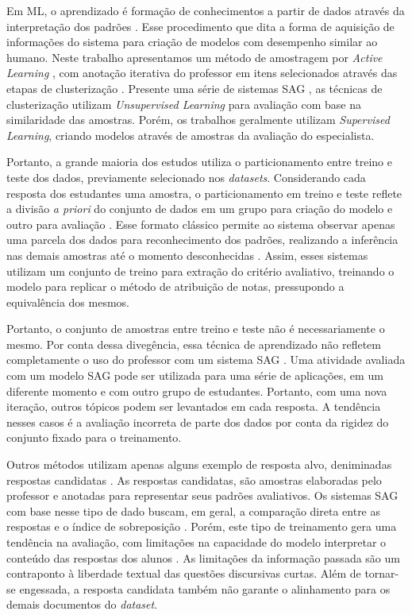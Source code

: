 Em ML, o aprendizado é formação de conhecimentos a partir de dados através da interpretação dos padrões \cite{bishop2006}. Esse procedimento que dita a forma de aquisição de informações do sistema para criação de modelos com desempenho similar ao humano. Neste trabalho apresentamos um método de amostragem por \textit{Active Learning} \cite{kumar2020}, com anotação iterativa do professor em itens selecionados através das etapas de clusterização \cite{horbach2018}. Presente uma série de sistemas SAG \cite{basu2013, zhang2016, marvaniya2018}, as técnicas de clusterização utilizam \textit{Unsupervised Learning} para avaliação com base na similaridade das amostras. Porém, os trabalhos geralmente utilizam \textit{Supervised Learning}, criando modelos através de amostras da avaliação do especialista.

Portanto, a grande maioria dos estudos utiliza o particionamento entre treino e teste dos dados, previamente selecionado nos \textit{datasets}. Considerando cada resposta dos estudantes uma amostra, o particionamento em treino e teste reflete a divisão \textit{a priori} do conjunto de dados em um grupo para criação do modelo e outro para avaliação \cite{heilman2015}. Esse formato clássico permite ao sistema observar apenas uma parcela dos dados para reconhecimento dos padrões, realizando a inferência nas demais amostras até o momento desconhecidas \cite{bishop2006}. Assim, esses sistemas utilizam um conjunto de treino para extração do critério avaliativo, treinando o modelo para replicar o método de atribuição de notas, pressupondo a equivalência dos mesmos.

Portanto, o conjunto de amostras entre treino e teste não é necessariamente o mesmo. Por conta dessa divegência, essa técnica de aprendizado não refletem completamente o uso do professor com um sistema SAG \cite{sung2019a}. Uma atividade avaliada com um modelo SAG pode ser utilizada para uma série de aplicações, em um diferente momento e com outro grupo de estudantes. Portanto, com uma nova iteração, outros tópicos podem ser levantados em cada resposta. A tendência nesses casos é a avaliação incorreta de parte dos dados por conta da rigidez do conjunto fixado para o treinamento.

Outros métodos utilizam apenas alguns exemplo de resposta alvo, deniminadas respostas candidatas \cite{banjade2015, roy2016}. As respostas candidatas, são amostras elaboradas pelo professor e anotadas para representar seus padrões avaliativos. Os sistemas SAG com base nesse tipo de dado buscam, em geral, a comparação direta entre as respostas e o índice de sobreposição \cite{kar2017, jimenez2013}. Porém, este tipo de treinamento gera uma tendência na avaliação, com limitações na capacidade do modelo interpretar o conteúdo das respostas dos alunos \cite{ramachandran2015a}. As limitações da informação passada são um contraponto à liberdade textual das questões discursivas curtas. Além de tornar-se engessada, a resposta candidata também não garante o alinhamento para os demais documentos do \textit{dataset}.

